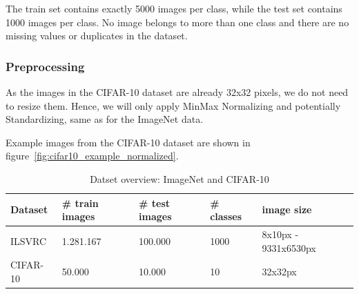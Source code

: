 The train set contains exactly 5000 images per class, while the test set contains 1000 images per class.
No image belongs to more than one class and there are no missing values or duplicates in the dataset.

\subsubsection{Preprocessing}
As the images in the CIFAR-10 dataset are already 32x32 pixels, we do not need to resize them.
Hence, we will only apply MinMax Normalizing and potentially Standardizing, same as for the ImageNet data.

Example images from the CIFAR-10 dataset are shown in figure~\ref{fig:cifar10_example_normalized}.

\begin{table}[ht]
    \begin{tabular}{lllll}
        Dataset  & \# train images & \# test images & \# classes & image size           \\ \hline \hline
        ILSVRC   & 1.281.167       & 100.000        & 1000       & 8x10px - 9331x6530px \\
        CIFAR-10 & 50.000          & 10.000         & 10         & 32x32px              \\ \hline \hline
    \end{tabular}
    \caption{Datset overview: ImageNet and CIFAR-10}
    \label{tab:datasets}
\end{table}
